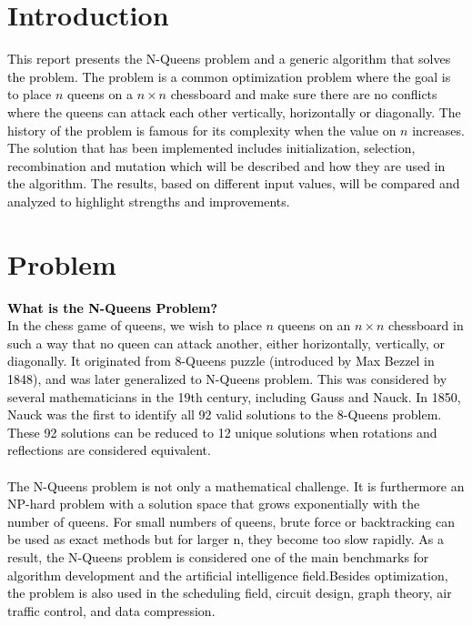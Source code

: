 \documentclass{scrartcl}
\title{\reportname}
\subtitle{An Evolutionary Algorithm for the N-Queen problem}
\author{Sandra Carlsson\quad Besan Ewir \\ Eddie Olofsgård\quad Ebba Brage}
\date{\today}
\begin{document}
\maketitle



\section{Introduction}
\label{sec:intro}

\textcolor{black}{This report presents the N-Queens problem and a generic algorithm that solves the problem. The problem is a common optimization problem where the goal is to place $n$ queens on a $n \times n$ chessboard and make sure there are no conflicts where the queens can attack each other vertically, horizontally or diagonally. The history of the problem is famous for its complexity when the value on $n$ increases. The solution that has been implemented includes initialization, selection, recombination and mutation which will be described and how they are used in the algorithm. The results, based on different input values, will be compared and analyzed to highlight strengths and improvements. }


\section{Problem}
\label{sec:problem_description}
\textcolor{black}{\textbf{What is the N-Queens Problem?\\} In the chess game of queens, we wish to place $n$ queens on an $n \times n$ chessboard in such a way that no queen can attack another, either horizontally, vertically, or diagonally. It originated from 8-Queens puzzle (introduced by Max Bezzel in 1848), and was later generalized to N-Queens problem. This was considered by several mathematicians in the 19th century, including Gauss and Nauck. In 1850, Nauck was the first to identify all 92 valid solutions to the 8-Queens problem. These 92 solutions can be reduced to 12 unique solutions when rotations and reflections are considered equivalent. \\ \\ The N-Queens problem is not only a mathematical challenge. It is furthermore an NP-hard problem with a solution space that grows exponentially with the number of queens. For small numbers of queens, brute force or backtracking can be used as exact methods but for larger n, they become too slow rapidly. As a result, the N-Queens problem is considered one of the main benchmarks for algorithm development and the artificial intelligence field.Besides optimization, the problem is also used in the scheduling field, circuit design, graph theory, air traffic control, and data compression.}
\end{document}
